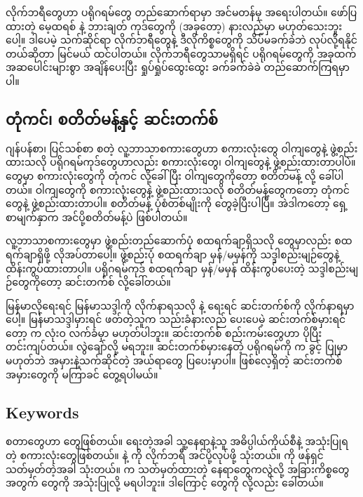 လိုက်ဘရီတွေဟာ ပရိုဂရမ်တွေ တည်ဆောက်ရာမှာ အင်မတန်မှ အရေးပါတယ်။ ဖော်ပြထားတဲ့ မေ့ထရစ် နဲ့ ဘားချတ်  ကုဒ်တွေကို (အခုတော့) နားလည်မှာ မဟုတ်သေးဘူးပေါ့။ ဒါပေမဲ့ သက်ဆိုင်ရာ လိုက်ဘရီတွေနဲ့ ဒီလိုကိစ္စတွေကို သိပ်မခက်ခဲဘဲ လုပ်လို့ရနိုင်တယ်ဆိုတာ မြင်မယ် ထင်ပါတယ်။ လိုက်ဘရီတွေသာမရှိရင် ပရိုဂရမ်တွေကို အခုထက် အဆပေါင်းများစွာ အချိန်ပေးပြီး ရှုပ်ရှုပ်ထွေးထွေး ခက်ခက်ခဲခဲ တည်ဆောက်ကြရမှာပါ။ 


\subsection*{တုံကင်၊ စတိတ်မန့်နှင့် ဆင်းတက်စ်}
ဂျန်ပန်စာ၊ ပြင်သစ်စာ စတဲ့ လူ့ဘာသာစကားတွေဟာ  စကားလုံးတွေ ဝါကျတွေနဲ့ ဖွဲ့စည်းထားသလို ပရိုဂရမ်ကုဒ်တွေဟာလည်း စကားလုံးတွေ၊ ဝါကျတွေနဲ့ ဖွဲ့စည်းထားတာပါပဲ။  တွေမှာ စကားလုံးတွေကို တုံကင်  လို့ခေါ်ပြီး  ဝါကျတွေကိုတော့ စတိတ်မန့်  လို့ ခေါ်ပါတယ်။ ဝါကျတွေကို စကားလုံးတွေနဲ့ ဖွဲ့စည်းထားသလို စတိတ်မန့်တွေကတော့ တုံကင်တွေနဲ့ ဖွဲ့စည်းထားတာပါ။ စတိတ်မန့် ပုံစံတစ်မျိုးကို တွေခဲ့ပြီးပါပြီ။ အဲဒါကတော့ ရှေ့စာမျက်နှာက အင်ပို့စတိတ်မန့်ပဲ ဖြစ်ပါတယ်။ 

လူ့ဘာသာစကားတွေမှာ ဖွဲ့စည်းတည်ဆောက်ပုံ စထရက်ချာရှိသလို  တွေမှာလည်း စထရက်ချာရှိဖို့ လိုအပ်တာပေါ့။  ဖွဲ့စည်းပုံ စထရက်ချာ မှန်/မမှန်ကို သဒ္ဒါစည်းမျဉ်တွေနဲ့ ထိန်းကွပ်ထားတာပါ။ ပရိုဂရမ်ကုဒ် စထရက်ချာ မှန်/မမှန် ထိန်းကွပ်ပေးတဲ့ သဒ္ဒါစည်းမျဉ်တွေကိုတော့ ဆင်းတက်စ်  လို့ခေါ်တယ်။

မြန်မာလိုရေးရင် မြန်မာသဒ္ဒါကို လိုက်နာရသလို  နဲ့ ရေးရင်  ဆင်းတက်စ်ကို လိုက်နာရမှာပေါ့။ မြန်မာသဒ္ဒါမှားရင် ဖတ်တဲ့သူက သည်းခံနားလည် ပေးပေမဲ့ ဆင်းတက်စ်မှားရင်တော့  က လုံးဝ လက်ခံမှာ မဟုတ်ပါဘူး။ ဆင်းတက်စ် စည်းကမ်းတွေဟာ ပိုပြီး တင်းကျပ်တယ်။ လွဲချော်လို့ မရဘူး။ ဆင်းတက်စ်မှားနေတဲ့ ပရိုဂရမ်ကို   က  ခွင့် ပြုမှာမဟုတ်ဘဲ အမှားနဲ့သက်ဆိုင်တဲ့ အယ်ရာတွေ ပြပေးမှာပါ။ ဖြစ်လေ့ရှိတဲ့ ဆင်းတက်စ်အမှားတွေကို မကြာခင် တွေ့ရပါမယ်။

\subsection*{Keywords}
\fEn{,} \fEn{,}  \fEn{,}  စတာတွေဟာ  တွေဖြစ်တယ်။  ရေးတဲ့အခါ သူ့နေရာနဲ့သူ အဓိပ္ပါယ်ကိုယ်စီနဲ့ အသုံးပြုရတဲ့ စကားလုံးတွေဖြစ်တယ်။  နဲ့  ကို လိုက်ဘရီ အင်ပို့လုပ်ဖို့ သုံးတယ်။  ကို ဖန်ရှင် သတ်မှတ်တဲ့အခါ သုံးတယ်။  က သတ်မှတ်ထားတဲ့ နေရာတွေကလွဲလို့ အခြားကိစ္စတွေအတွက်  တွေကို အသုံးပြုလို့ မရပါဘူး။ ဒါကြောင့်   တွေကို  လို့လည်း ခေါ်တယ်။ 


